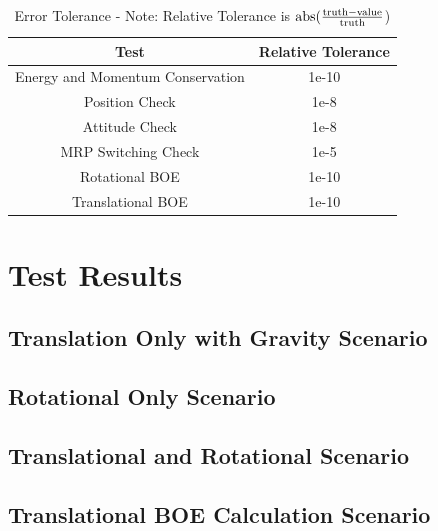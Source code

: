 \begin{table}[htbp]
	\caption{Error Tolerance - Note: Relative Tolerance is $\textnormal{abs}(\frac{\textnormal{truth} - \textnormal{value}}{\textnormal{truth}}$)}
	\label{tab:errortol}
	\centering \fontsize{10}{10}\selectfont
	\begin{tabular}{ c | c } %
		\hline
		\textbf{Test}   & \textbf{Relative Tolerance} \\
		\hline
		Energy and Momentum Conservation & 1e-10 \\
		Position Check & 1e-8 \\
		Attitude Check & 1e-8 \\
		MRP Switching Check & 1e-5 \\
		Rotational BOE & 1e-10 \\
		Translational BOE & 1e-10 \\
		\hline	
	\end{tabular}
\end{table}

\clearpage

\section{Test Results}

\subsection{Translation Only with Gravity Scenario}


\clearpage

\subsection{Rotational Only Scenario}





\clearpage

\subsection{Translational and Rotational Scenario}




\clearpage

\subsection{Translational BOE Calculation Scenario}


\clearpage